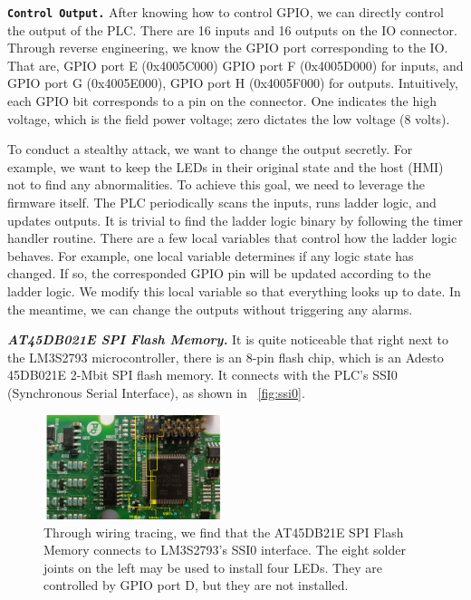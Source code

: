 \textbf{\texttt{Control Output.}} After knowing how to control GPIO, we can directly control the output of the PLC. There are 16 inputs and 16 outputs on the IO connector. Through reverse engineering, we know the GPIO port corresponding to the IO.  That are, GPIO port E (0x4005C000) GPIO port F (0x4005D000) for inputs, and GPIO port G (0x4005E000), GPIO port H (0x4005F000) for outputs. Intuitively, each GPIO bit corresponds to a pin on the connector. One indicates the high voltage, which is the field power voltage; zero dictates the low voltage (8 volts).

To conduct a stealthy attack, we want to change the output secretly. For example, we want to keep the LEDs in their original state and the host (HMI) not to find any abnormalities. To achieve this goal, we need to leverage the firmware itself. The PLC periodically scans the inputs, runs ladder logic, and updates outputs.  It is trivial to find the ladder logic binary by following the timer handler routine. There are a few local variables that control how the ladder logic behaves. For example, one local variable determines if any logic state has changed. If so, the corresponded GPIO pin will be updated according to the ladder logic. We modify this local variable so that everything looks up to date. In the meantime,  we can change the outputs without triggering any alarms.



\textbf{\textit{AT45DB021E SPI Flash Memory.}}  It is quite noticeable that right next to the LM3S2793 microcontroller,  there is an 8-pin flash chip, which is an Adesto 45DB021E 2-Mbit SPI flash memory. It connects with the PLC's SSI0 (Synchronous Serial Interface), as shown in ~\autoref{fig:ssi0}.

\begin{figure}[th]
	\includegraphics[width=0.47\textwidth]{figures/ssi0}
	\centering
	\caption{Through wiring tracing, we find that the AT45DB21E SPI Flash Memory connects to LM3S2793's SSI0 interface. The eight solder joints on the left may be used to install four LEDs. They are controlled by GPIO port D,  but they are not installed.}
	\label{fig:ssi0}
\end{figure}


